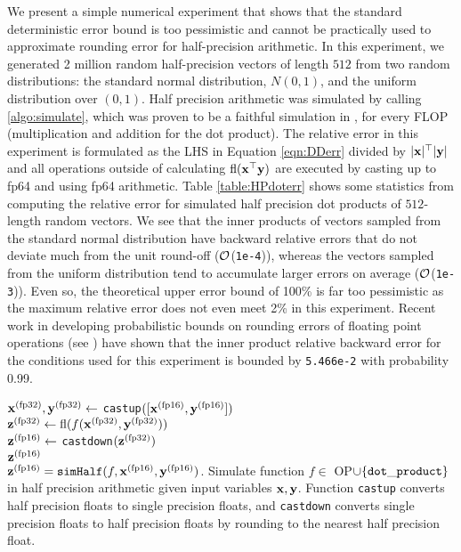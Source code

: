 We present a simple numerical experiment that shows that the standard deterministic error bound is too pessimistic and cannot be practically used to approximate rounding error for half-precision arithmetic. 
In this experiment, we generated 2 million random half-precision vectors of length $512$ from two random distributions: the standard normal distribution, $N(0,1)$, and the uniform distribution over $(0,1)$.
Half precision arithmetic was simulated by calling \cref{algo:simulate}, which was proven to be a faithful simulation in \cite{HighamPranesh2019b}, for every FLOP (multiplication and addition for the dot product).
The relative error in this experiment is formulated as the LHS in Equation \ref{eqn:DDerr} divided by $|\mathbf{x}|^{\top}|\mathbf{y}|$ and all operations outside of calculating $\mathrm{fl}(\mathbf{x}^{\top}\mathbf{y})$ are executed by casting up to fp64 and using fp64 arithmetic.
Table \ref{table:HPdoterr} shows some statistics from computing the relative error for simulated half precision dot products of $512$-length random vectors. 
We see that the inner products of vectors sampled from the standard normal distribution have backward relative errors that do not deviate much from the unit round-off ($\mathcal{O}$({\tt 1e-4})), whereas the vectors sampled from the uniform distribution tend to accumulate larger errors on average ($\mathcal{O}$({\tt 1e-3})). 
Even so, the theoretical upper error bound of 100\% is far too pessimistic as the maximum relative error does not even meet 2\% in this experiment.
Recent work in developing probabilistic bounds on rounding errors of floating point operations (see \cite{Higham2019a,Ipsen2019}) have shown that the inner product relative backward error for the conditions used for this experiment is bounded by {\tt 5.466e-2} with probability 0.99. \par
\begin{algorithm2e}
	\DontPrintSemicolon %
	$\mathbf{x}^{(\text{fp32})}, \mathbf{y}^{(\text{fp32})} \gets$ {\tt castup}$([\mathbf{x}^{(\text{fp16})},\mathbf{y}^{(\text{fp16})}])$\\
	$\mathbf{z}^{(\text{fp32})} \gets \mathrm{fl}(f(\mathbf{x}^{(\text{fp32})}, \mathbf{y}^{(\text{fp32})}))$\\
	$\mathbf{z}^{(\text{fp16})} \gets$ {\tt castdown}$(\mathbf{z}^{(\text{fp32})})$\\
	\Return $\mathbf{z}^{(\text{fp16})}$\\
	\caption{$\mathbf{z}^{(\text{fp16})} = {\tt simHalf}(f, \mathbf{x}^{(\text{fp16})}, \mathbf{y}^{(\text{fp16})})$. Simulate function $f\in$ OP$\cup \{{\tt dot\_product} \}$ in half precision arithmetic given input variables $\mathbf{x},\mathbf{y}$. Function {\tt castup} converts half precision floats to single precision floats, and {\tt castdown} converts single precision floats to half precision floats by rounding to the nearest half precision float.}
	\label{algo:simulate}
\end{algorithm2e}
